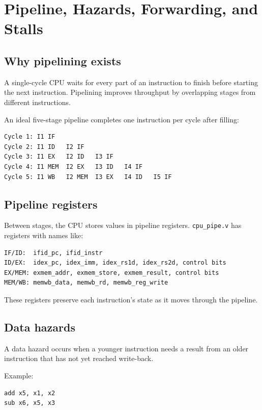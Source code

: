\section{Pipeline, Hazards, Forwarding, and Stalls}

\subsection{Why pipelining exists}

A single-cycle CPU waits for every part of an instruction to finish before starting the next instruction. Pipelining improves throughput by overlapping stages from different instructions.

An ideal five-stage pipeline completes one instruction per cycle after filling:

\begin{lstlisting}[language={}]
Cycle 1: I1 IF
Cycle 2: I1 ID   I2 IF
Cycle 3: I1 EX   I2 ID   I3 IF
Cycle 4: I1 MEM  I2 EX   I3 ID   I4 IF
Cycle 5: I1 WB   I2 MEM  I3 EX   I4 ID   I5 IF
\end{lstlisting}

\subsection{Pipeline registers}

Between stages, the CPU stores values in pipeline registers. \texttt{cpu\_pipe.v} has registers with names like:

\begin{lstlisting}[language={}]
IF/ID:  ifid_pc, ifid_instr
ID/EX:  idex_pc, idex_imm, idex_rs1d, idex_rs2d, control bits
EX/MEM: exmem_addr, exmem_store, exmem_result, control bits
MEM/WB: memwb_data, memwb_rd, memwb_reg_write
\end{lstlisting}

These registers preserve each instruction’s state as it moves through the pipeline.

\subsection{Data hazards}

A data hazard occurs when a younger instruction needs a result from an older instruction that has not yet reached write-back.

Example:

\begin{lstlisting}[language={}]
add x5, x1, x2
sub x6, x5, x3
\end{lstlisting}

